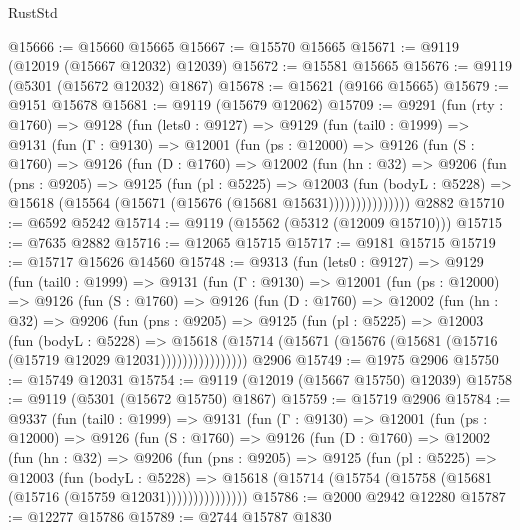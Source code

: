\begin{lexlean}{RustStd}
\begin{coremodule}
@15666 := @15660 @15665
@15667 := @15570 @15665
@15671 := @9119 (@12019 (@15667 @12032) @12039)
@15672 := @15581 @15665
@15676 := @9119 (@5301 (@15672 @12032) @1867)
@15678 := @15621 (@9166 @15665)
@15679 := @9151 @15678
@15681 := @9119 (@15679 @12062)
@15709 := @9291
    (fun (rty : @1760) =>
    @9128
      (fun (lets0 : @9127) =>
      @9129
        (fun (tail0 : @1999) =>
        @9131
          (fun (Γ : @9130) =>
          @12001
            (fun (ps : @12000) =>
            @9126
              (fun (S : @1760) =>
              @9126
                (fun (D : @1760) =>
                @12002
                  (fun (hn : @32) =>
                  @9206
                    (fun (pns : @9205) =>
                    @9125
                      (fun (pl : @5225) =>
                      @12003
                        (fun (bodyL : @5228) =>
                        @15618 (@15564 (@15671 (@15676 (@15681 @15631)))))))))))))))
    @2882
@15710 := @6592 @5242
@15714 := @9119 (@15562 (@5312 (@12009 @15710)))
@15715 := @7635 @2882
@15716 := @12065 @15715
@15717 := @9181 @15715
@15719 := @15717 @15626 @14560
@15748 := @9313
    (fun (lets0 : @9127) =>
    @9129
      (fun (tail0 : @1999) =>
      @9131
        (fun (Γ : @9130) =>
        @12001
          (fun (ps : @12000) =>
          @9126
            (fun (S : @1760) =>
            @9126
              (fun (D : @1760) =>
              @12002
                (fun (hn : @32) =>
                @9206
                  (fun (pns : @9205) =>
                  @9125
                    (fun (pl : @5225) =>
                    @12003
                      (fun (bodyL : @5228) =>
                      @15618
                        (@15714
                          (@15671 (@15676 (@15681 (@15716 (@15719 @12029 @12031))))))))))))))))
    @2906
@15749 := @1975 @2906
@15750 := @15749 @12031
@15754 := @9119 (@12019 (@15667 @15750) @12039)
@15758 := @9119 (@5301 (@15672 @15750) @1867)
@15759 := @15719 @2906
@15784 := @9337
    (fun (tail0 : @1999) =>
    @9131
      (fun (Γ : @9130) =>
      @12001
        (fun (ps : @12000) =>
        @9126
          (fun (S : @1760) =>
          @9126
            (fun (D : @1760) =>
            @12002
              (fun (hn : @32) =>
              @9206
                (fun (pns : @9205) =>
                @9125
                  (fun (pl : @5225) =>
                  @12003
                    (fun (bodyL : @5228) =>
                    @15618 (@15714 (@15754 (@15758 (@15681 (@15716 (@15759 @12031)))))))))))))))
@15786 := @2000 @2942 @12280
@15787 := @12277 @15786
@15789 := @2744 @15787 @1830

\end{coremodule}
\end{lexlean}
